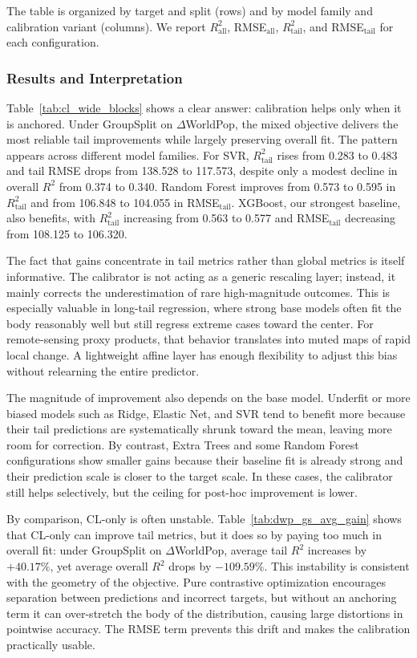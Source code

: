 \documentclass[preprint,12pt]{elsarticle}
\begin{document}
The table is organized by target and split (rows) and by model family and calibration variant (columns). We report $R^2_{\text{all}}$, RMSE$_{\text{all}}$, $R^2_{\text{tail}}$, and RMSE$_{\text{tail}}$ for each configuration.

\subsubsection{Results and Interpretation}

Table~\ref{tab:cl_wide_blocks} shows a clear answer: calibration helps only when it is anchored. Under GroupSplit on $\Delta$WorldPop, the mixed objective delivers the most reliable tail improvements while largely preserving overall fit. The pattern appears across different model families. For SVR, $R^2_{\text{tail}}$ rises from 0.283 to 0.483 and tail RMSE drops from 138.528 to 117.573, despite only a modest decline in overall $R^2$ from 0.374 to 0.340. Random Forest improves from 0.573 to 0.595 in $R^2_{\text{tail}}$ and from 106.848 to 104.055 in RMSE$_{\text{tail}}$. XGBoost, our strongest baseline, also benefits, with $R^2_{\text{tail}}$ increasing from 0.563 to 0.577 and RMSE$_{\text{tail}}$ decreasing from 108.125 to 106.320.

The fact that gains concentrate in tail metrics rather than global metrics is itself informative. The calibrator is not acting as a generic rescaling layer; instead, it mainly corrects the underestimation of rare high-magnitude outcomes. This is especially valuable in long-tail regression, where strong base models often fit the body reasonably well but still regress extreme cases toward the center. For remote-sensing proxy products, that behavior translates into muted maps of rapid local change. A lightweight affine layer has enough flexibility to adjust this bias without relearning the entire predictor.

The magnitude of improvement also depends on the base model. Underfit or more biased models such as Ridge, Elastic Net, and SVR tend to benefit more because their tail predictions are systematically shrunk toward the mean, leaving more room for correction. By contrast, Extra Trees and some Random Forest configurations show smaller gains because their baseline fit is already strong and their prediction scale is closer to the target scale. In these cases, the calibrator still helps selectively, but the ceiling for post-hoc improvement is lower.

By comparison, CL-only is often unstable. Table~\ref{tab:dwp_gs_avg_gain} shows that CL-only can improve tail metrics, but it does so by paying too much in overall fit: under GroupSplit on $\Delta$WorldPop, average tail $R^2$ increases by $+40.17\%$, yet average overall $R^2$ drops by $-109.59\%$. This instability is consistent with the geometry of the objective. Pure contrastive optimization encourages separation between predictions and incorrect targets, but without an anchoring term it can over-stretch the body of the distribution, causing large distortions in pointwise accuracy. The RMSE term prevents this drift and makes the calibration practically usable.
\end{document}
